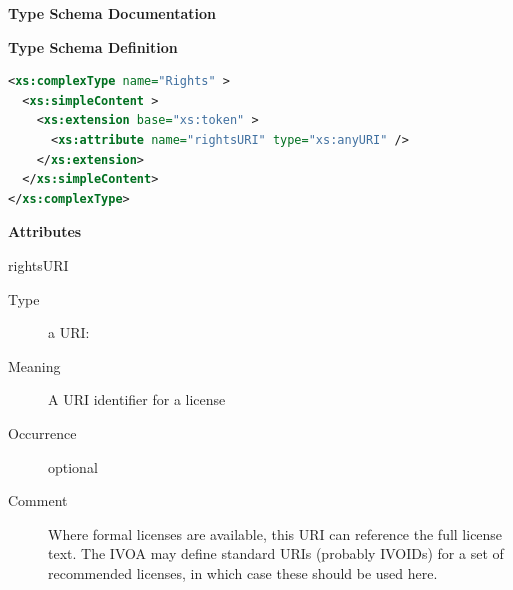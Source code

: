 \documentclass[11pt,a4paper]{ivoa}
\begin{document}
\begin{generated}
\begingroup
      	\renewcommand*\descriptionlabel[1]{%
      	\hbox to 5.5em{\emph{#1}\hfil}}\vspace{2ex}\noindent\textbf{ Type Schema Documentation}


\vspace{1ex}\noindent\textbf{ Type Schema Definition}

\begin{lstlisting}[language=XML,basicstyle=\footnotesize]
<xs:complexType name="Rights" >
  <xs:simpleContent >
    <xs:extension base="xs:token" >
      <xs:attribute name="rightsURI" type="xs:anyURI" />
    </xs:extension>
  </xs:simpleContent>
</xs:complexType>
\end{lstlisting}

\vspace{0.5ex}\noindent\textbf{ Attributes}

\begingroup\small\begin{bigdescription}
\item[rightsURI]
\begin{description}
\item[Type] a URI: 
\item[Meaning] 
                     A URI identifier for a license
                  
\item[Occurrence] optional
\item[Comment] 
                     Where formal licenses are available, this URI can
                     reference the full license text.  The IVOA may define
                     standard URIs (probably IVOIDs) for a set of recommended
                     licenses, in which case these should be used here.
                  
\end{description}


\end{bigdescription}\endgroup

\endgroup
\end{generated}
\end{document}
